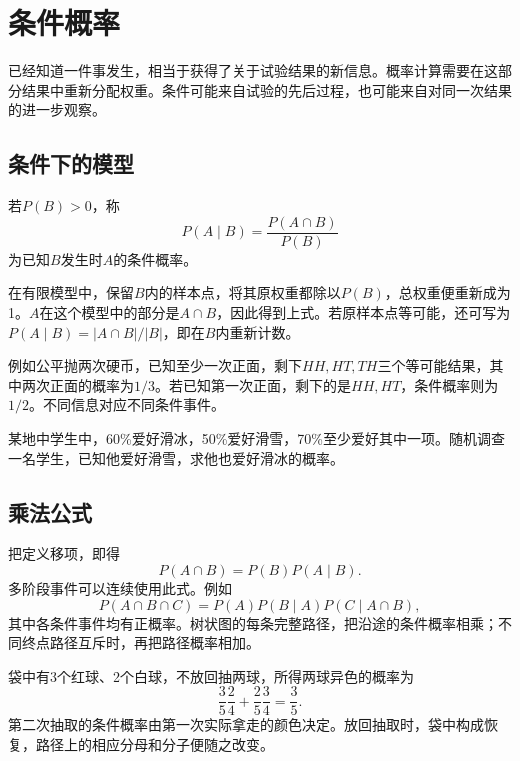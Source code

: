 \FloatBarrier
\newpage
\section{条件概率}
\label{sec:prob-conditional}

已经知道一件事发生，相当于获得了关于试验结果的新信息。概率计算需要在这部分结果中重新分配权重。条件可能来自试验的先后过程，也可能来自对同一次结果的进一步观察。

\subsection{条件下的模型}

\begin{definition}
若\(P(B)>0\)，称
\begin{equation}\label{eq:prob-conditional}
 P(A\mid B)=\frac{P(A\cap B)}{P(B)}
\end{equation}
为已知\(B\)发生时\(A\)的{\heiti 条件概率}。
\end{definition}

在有限模型中，保留\(B\)内的样本点，将其原权重都除以\(P(B)\)，总权重便重新成为1。\(A\)在这个模型中的部分是\(A\cap B\)，因此得到上式。若原样本点等可能，还可写为\(P(A\mid B)=|A\cap B|/|B|\)，即在\(B\)内重新计数。

例如公平抛两次硬币，已知至少一次正面，剩下\(HH,HT,TH\)三个等可能结果，其中两次正面的概率为\(1/3\)。若已知第一次正面，剩下的是\(HH,HT\)，条件概率则为\(1/2\)。不同信息对应不同条件事件。

\begin{example}
某地中学生中，60\%爱好滑冰，50\%爱好滑雪，70\%至少爱好其中一项。随机调查一名学生，已知他爱好滑雪，求他也爱好滑冰的概率。
\end{example}

\subsection{乘法公式}

把定义移项，即得
\begin{equation}\label{eq:prob-multiplication}
 P(A\cap B)=P(B)P(A\mid B).
\end{equation}
多阶段事件可以连续使用此式。例如
\[
 P(A\cap B\cap C)=P(A)P(B\mid A)P(C\mid A\cap B),
\]
其中各条件事件均有正概率。树状图的每条完整路径，把沿途的条件概率相乘；不同终点路径互斥时，再把路径概率相加。

袋中有3个红球、2个白球，不放回抽两球，所得两球异色的概率为
\[
 \frac35\frac24+\frac25\frac34=\frac35.
\]
第二次抽取的条件概率由第一次实际拿走的颜色决定。放回抽取时，袋中构成恢复，路径上的相应分母和分子便随之改变。


